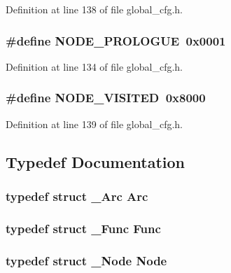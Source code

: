 Definition at line 138 of file global\_\-cfg.h.
\subsubsection{\setlength{\rightskip}{0pt plus 5cm}\#define NODE\_\-PROLOGUE~0x0001}\label{global__cfg_8h_165044393d9216a8c5bd57b21eaf1f10}




Definition at line 134 of file global\_\-cfg.h.
\subsubsection{\setlength{\rightskip}{0pt plus 5cm}\#define NODE\_\-VISITED~0x8000}\label{global__cfg_8h_fb004f75714c1b5ccc7cd4a3ae0cab5e}




Definition at line 139 of file global\_\-cfg.h.

\subsection{Typedef Documentation}
\subsubsection{\setlength{\rightskip}{0pt plus 5cm}typedef struct \bf{\_\-Arc}
 \bf{Arc}}\label{global__cfg_8h_64b16824e4b0ee19f9e0bff41acb3b58}


\subsubsection{\setlength{\rightskip}{0pt plus 5cm}typedef struct \bf{\_\-Func}
 \bf{Func}}\label{global__cfg_8h_3d6c4aa4faad1867d259313af1137f71}


\subsubsection{\setlength{\rightskip}{0pt plus 5cm}typedef struct \bf{\_\-Node}
 \bf{Node}}\label{global__cfg_8h_50654fe768fd8b59a2800ac8616eea6e}




